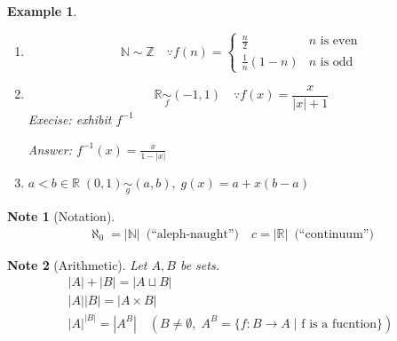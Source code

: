 \documentclass[11pt, oneside]{book}
\theoremstyle{break}
\newtheorem*{note}{Note}
\newtheorem{eg}{Example}[section]
\newcommand{\bb}[1]{\mathbb{#1}}			%
\begin{document}
\begin{eg}
	\begin{enumerate}
		\item \begin{equation*}
				\bb{N} \sim \bb{Z} \quad \because f(n) =
				\begin{cases}
					\frac{n}{2} & n \text{ is even} \\
					\frac{1}{n} (1 - n) & n \text{ is odd}
				\end{cases}
			\end{equation*}

		\item \begin{equation*}
			\bb{R} \underset{f}{\sim} (-1, 1) \quad \because f(x) = \frac{x}{|x| + 1}
		\end{equation*}
		Execise: exhibit $f^{-1}$

		Answer: $f^{-1}(x) = \frac{x}{1 - |x|}$
		
		\item $a < b \in \bb{R} \; (0, 1) \underset{g}{\sim} (a, b), \; g(x) = a + x(b - a)$
	\end{enumerate}
\end{eg}

\begin{note}[Notation]
	\begin{gather*}
		\aleph_0 = |\bb{N}| \enspace \text{(``aleph-naught'')} \quad c = |\bb{R}| \enspace \text{(``continuum'')}
	\end{gather*}
\end{note}

\begin{note}[Arithmetic]
	Let $A, B$ be sets.
	\begin{gather*}
		|A| + |B| = |A \sqcup B| \\
		|A||B| = |A \times B| \\
		|A|^{|B|} = |A^B| \quad (B \neq \emptyset, \; A^B = \{f: B \to A \; | \text{ f is a fucntion}\})
	\end{gather*}
\end{note}
\end{document}
